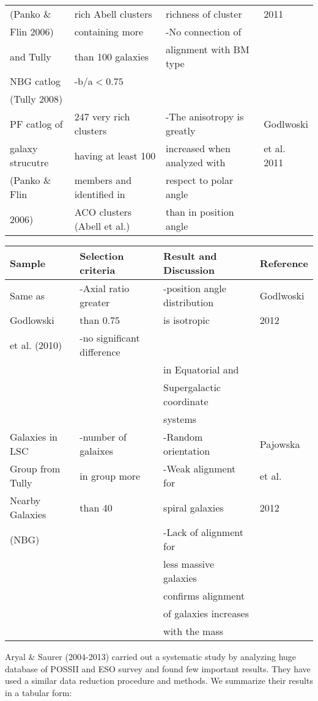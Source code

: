 \begin{center}
\begin{tabular}[lp=7cm]{|l|l|l|l|}
(Panko \& &rich Abell clusters&richness of cluster&2011\\
Flin 2006)&containing more&-No connection of &\\
and Tully&than 100 galaxies&alignment with BM type&\\
NBG catlog&-b/a$<0.75$&&\\
(Tully 2008)&&&\\
\hline
PF catlog of&247 very rich clusters&-The anisotropy is greatly&Godlwoski \\
galaxy strucutre&having at least 100&increased when analyzed with&et al. 2011\\
(Panko \& Flin&members and identified in&respect to polar angle&\\
2006)&ACO clusters (Abell et al.)&than in position angle&\\
\hline
\end{tabular}
\end{center}
\begin{center}
 \begin{tabular}[lp=7cm]{|l|l|l|l|}
\hline\hline
Sample		 		& Selection criteria 			& Result and Discussion 					& Reference\\
\hline
Same as &-Axial ratio greater&-position angle distribution&Godlwoski\\
Godlowski&than 0.75&is isotropic&2012\\
et al. (2010)&-no significant difference&&\\
&&in Equatorial and&\\
&&Supergalactic coordinate&\\
&&systems&\\
\hline
Galaxies in LSC&-number of galaixes&-Random orientation&Pajowska\\
Group from Tully&in group more&-Weak alignment for&et al.\\
Nearby Galaxies&than 40&spiral galaxies&2012\\
(NBG)&&-Lack of alignment for&\\
&&less massive galaxies&\\
&&confirms alignment&\\
&&of galaxies increases&\\
&&with the mass&\\
\hline

\end{tabular}
\end{center}
Aryal \& Saurer (2004-2013) carried out a systematic study by analyzing huge database of POSSII and ESO survey and found few important results. They have used a similar data reduction procedure and methods. We summarize their results in a tabular form:
